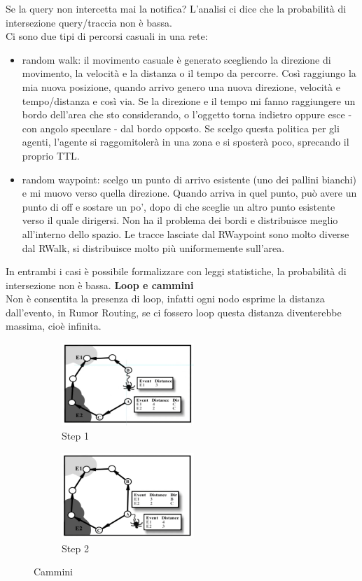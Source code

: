 \documentclass[12pt,italian]{report}
\begin{document}
\bigbreak
Se la query non intercetta mai la notifica? L'analisi ci dice che la probabilità di intersezione query/traccia non è bassa. \\ Ci sono due tipi di percorsi casuali in una rete:
\begin{itemize}
    \item random walk: il movimento casuale è generato scegliendo la direzione di movimento, la velocità e la distanza o il tempo da percorre. Così raggiungo la mia nuova posizione, quando arrivo genero una nuova direzione, velocità e tempo/distanza e così via. Se la direzione e il tempo mi fanno raggiungere un bordo dell'area che sto considerando, o l'oggetto torna indietro oppure esce - con angolo speculare - dal bordo opposto. Se scelgo questa politica per gli agenti, l'agente si raggomitolerà in una zona e si sposterà poco, sprecando il proprio TTL.
    \item random waypoint: scelgo un punto di arrivo esistente (uno dei pallini bianchi) e mi muovo verso quella direzione. Quando arriva in quel punto, può avere un punto di off e sostare un po', dopo di che sceglie un altro punto esistente verso il quale dirigersi. Non ha il problema dei bordi e distribuisce meglio all'interno dello spazio. Le tracce lasciate dal RWaypoint sono molto diverse dal RWalk, si distribuisce molto più uniformemente sull'area. 
\end{itemize}
In entrambi i casi è possibile formalizzare con leggi statistiche, la probabilità di intersezione non è bassa. 
\bigbreak
\noindent \textbf{Loop e cammini} \\
Non è consentita la presenza di loop, infatti ogni nodo esprime la distanza dall'evento, in Rumor Routing, se ci fossero loop questa distanza diventerebbe massima, cioè infinita. 
\begin{figure}[h]
     \centering
     \begin{subfigure}[b]{0.3\textwidth}
         \centering
         \includegraphics[width=50mm]{img/prima.PNG}
         \caption{Step 1}
     \end{subfigure}
     \hfill
     \begin{subfigure}[b]{0.3\textwidth}
         \centering
          \includegraphics[width=50mm]{img/prima2.PNG}
          \caption{Step 2}
     \end{subfigure}
    \caption{Cammini }
    \label{fig:camm}
\end{figure}
\end{document}
